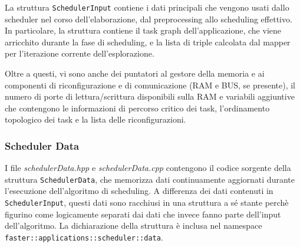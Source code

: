 La struttura \verb+SchedulerInput+ contiene i dati principali che vengono usati 
dallo scheduler nel corso dell'elaborazione, dal preprocessing allo scheduling 
effettivo. In particolare, la struttura contiene il task graph dell'applicazione,
che viene arricchito durante la fase di scheduling, e la lista di triple calcolata
dal mapper per l'iterazione corrente dell'esplorazione.

Oltre a questi, vi sono anche dei puntatori al gestore della memoria e ai 
componenti di riconfigurazione e di comunicazione (\acs{RAM} e BUS, se 
presente), il numero di porte di lettura/scrittura disponibili sulla \acs{RAM} 
e variabili aggiuntive che contengono le informazioni di percorso critico dei 
task, l'ordinamento topologico dei task e la lista delle riconfigurazioni.

\subsubsection{Scheduler Data}
I file \emph{schedulerData.hpp} e \emph{schedulerData.cpp} contengono il codice 
sorgente della struttura \verb+SchedulerData+, che memorizza dati continuamente 
aggiornati durante l'esecuzione dell'algoritmo di scheduling. A differenza dei 
dati contenuti in \verb+SchedulerInput+, questi dati sono racchiusi in una 
struttura a sé stante perchè figurino come logicamente separati dai dati che 
invece fanno parte dell'input dell'algoritmo. La dichiarazione della struttura è
inclusa nel namespace \verb+faster::applications::scheduler::data+.

